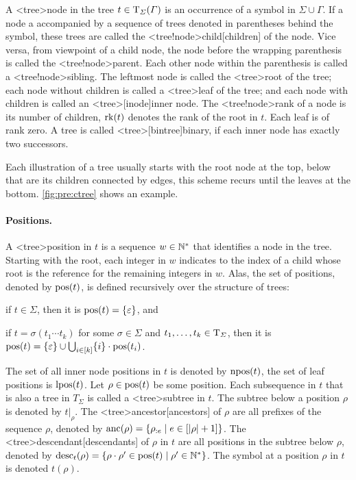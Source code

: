 \documentclass[../document.tex]{subfiles}
\begin{document}
    A <tree>{node} in the tree \(t \in \operatorname{T}_\varSigma(\varGamma)\) is an occurrence of a symbol in \(\varSigma \cup \varGamma\).
    If a node a accompanied by a sequence of trees denoted in parentheses behind the symbol, these trees are called the <tree!node>{child}[children] of the node.
    Vice versa, from viewpoint of a child node, the node before the wrapping parenthesis is called the <tree!node>{parent}.
    Each other node within the parenthesis is called a <tree!node>{sibling}.
    The leftmost node is called the <tree>{root} of the tree; each node without children is called a <tree>{leaf} of the tree; and each node with children is called an <tree>[inode]{inner node}.
    The <tree!node>{rank} of a node is its number of children, \(\operatorname{rk}(t)\) denotes the rank of the root in \(t\).
    Each leaf is of rank zero.
    A tree is called <tree>[bintree]{binary}, if each inner node has exactly two successors.

    Each illustration of a tree usually starts with the root node at the top, below that are its children connected by edges, this scheme recurs until the leaves at the bottom.
    \cref{fig:pre:ctree} shows an example.

    \paragraph{Positions.}
    A <tree>{position} in \(t\) is a sequence $w \in \mathbb{N}^*$ that identifies a node in the tree.
    Starting with the root, each integer in \(w\) indicates to the index of a child whose root is the reference for the remaining integers in \(w\).
    Alas, the set of positions, denoted by \(\operatorname{pos}(t)\), is defined recursively over the structure of trees:
    \begin{inparaenum}
        \item if \(t \in \varSigma\), then it is \(\operatorname{pos}(t) = \{\varepsilon\}\), and
        \item if \(t = \sigma(t_1 \cdots t_k)\) for some \(\sigma\in \varSigma\) and \(t_1, \ldots, t_k \in \operatorname{T}_\varSigma\), then it is \(\operatorname{pos}(t) = \{\varepsilon\} \cup \bigcup_{i\in[k]} \{i\}\cdot \operatorname{pos}(t_i)\).
    \end{inparaenum}
    The set of all inner node positions in \(t\) is denoted by \(\operatorname{npos}(t)\), the set of leaf positions is \(\operatorname{lpos}(t)\).
    Let \(\rho \in \operatorname{pos}(t)\) be some position.
    Each subsequence in \(t\) that is also a tree in \(T_\varSigma\) is called a <tree>{subtree} in \(t\).
    The subtree below a position \(\rho\) is denoted by \(t|_\rho\).
    The <tree>{ancestor}[ancestors] of \(\rho\) are all prefixes of the sequence \(\rho\), denoted by \(\operatorname{anc}(\rho) = \{ \rho_{:e} \mid e \in [|\rho|+1] \}\).
    The <tree>{descendant}[descendants] of \(\rho\) in \(t\) are all positions in the subtree below \(\rho\), denoted by \(\operatorname{desc}_t(\rho) = \{ \rho \cdot \rho' \in \operatorname{pos}(t) \mid \rho' \in \mathbb{N}^* \}\).
    The symbol at a position \(\rho\) in \(t\) is denoted  \(t(\rho)\).
\end{document}
